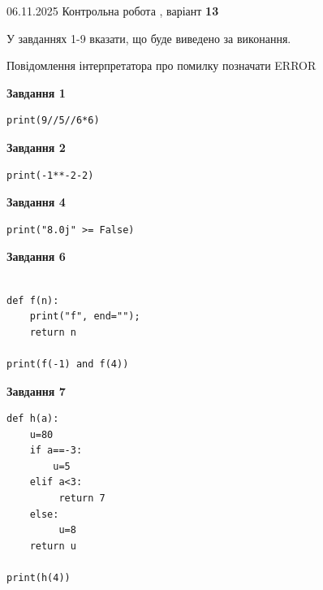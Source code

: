\documentclass[12pt, ukrainian]{article}
\begin{document}
{\Large{06.11.2025 Контрольна робота , варіант  \No \textbf { 13 }\par}}
{
\begin {large}
У завданнях 1-9 вказати, що буде виведено за виконання.

Повідомлення інтерпретатора про помилку позначати ERROR

\begin{minipage}[t]{7.5cm}

\begin{center}
\textbf{Завдання 1}
\end{center}

\begin{verbatim}
print(9//5//6*6)
\end{verbatim}



\begin{center}
\textbf{Завдання 2}
\end{center}

\begin{verbatim}
print(-1**-2-2)
\end{verbatim}



\begin{center}
\textbf{Завдання 4}
\end{center}

\begin{verbatim}
print("8.0j" >= False)
\end{verbatim}



\begin{center}
\textbf{Завдання 6}
\end{center}

\begin{verbatim}

def f(n):
    print("f", end="");
    return n

print(f(-1) and f(4))
\end{verbatim}



\begin{center}
\textbf{Завдання 7}
\end{center}

\begin{verbatim}
def h(a):
    u=80
    if a==-3: 
        u=5
    elif a<3:
         return 7
    else:
         u=8
    return u

print(h(4))
\end{verbatim}


\end{minipage}
\end{large}}
\end{document}
